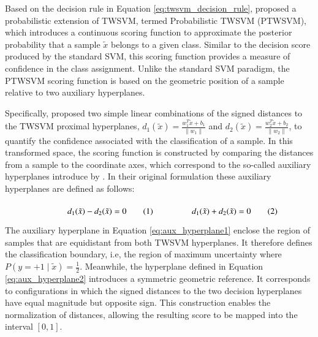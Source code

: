 \documentclass[12pt]{report} %
\begin{document}
Based on the decision rule in Equation \ref{eq:twsvm_decision_rule}, \cite{shao2012probabilistic} proposed a probabilistic extension of TWSVM, termed Probabilistic TWSVM (PTWSVM), which introduces a continuous scoring function to approximate the posterior probability that a sample $\tilde{x}$ belongs to a given class. Similar to the decision score produced by the standard SVM, this scoring function provides a measure of confidence in the class assignment. Unlike the standard SVM paradigm, the PTWSVM scoring function is based on the geometric position of a sample relative to two auxiliary hyperplanes.

\newpage

Specifically, \cite{shao2012probabilistic} proposed two simple linear combinations of the signed distances to the TWSVM proximal hyperplanes, $d_1(\tilde{x}) = \frac{w_1^T\tilde{x} + b_1}{\|w_1\|}$ and $d_2(\tilde{x}) = \frac{w_2^T\tilde{x} + b_2}{\|w_2\|}$, to quantify the confidence associated with the classification of a sample. In this transformed space, the scoring function is constructed by comparing the distances from a sample to the coordinate axes, which correspond to the so-called auxiliary hyperplanes introduce by \cite{shao2012probabilistic}. In their original formulation these auxiliary hyperplanes are defined as follows:

\begin{subequations}
\begin{minipage}{0.38\textwidth}
\begin{equation}
\label{eq:aux_hyperplane1}
d_1(\tilde{x}) - d_2(\tilde{x}) = 0
\end{equation}
\end{minipage}
\hspace{0.5cm}
\begin{minipage}{0.38\textwidth}
\begin{equation}
\label{eq:aux_hyperplane2}
d_1(\tilde{x}) + d_2(\tilde{x}) = 0
\end{equation}
\end{minipage}
\end{subequations}

The auxiliary hyperplane in Equation \ref{eq:aux_hyperplane1} enclose the region of samples that are equidistant from both TWSVM hyperplanes. It therefore defines the classification boundary, i.e, the region of maximum uncertainty where $P(y = +1 \mid \tilde{x}) = \frac{1}{2}$. Meanwhile, the hyperplane defined in Equation \ref{eq:aux_hyperplane2} introduces a symmetric geometric reference. It corresponds to configurations in which the signed distances to the two decision hyperplanes have equal magnitude but opposite sign. This construction enables the normalization of distances, allowing the resulting score to be mapped into the interval $[0,1]$.
\end{document}
